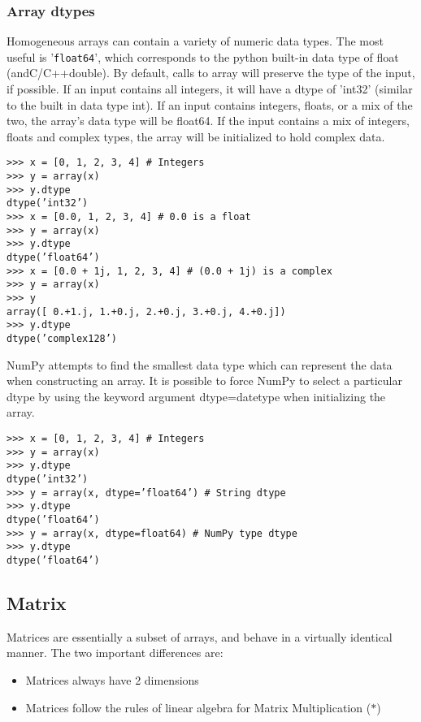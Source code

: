 \documentclass[KSmain.tex]{subfiles}
\begin{document}
\subsubsection*{Array dtypes}
Homogeneous arrays can contain a variety of numeric data types. The most useful is ’\texttt{float64}’, which corresponds
to the python built-in data type of float (andC/C++double). By default, calls to array will preserve
the type of the input, if possible. If an input contains all integers, it will have a dtype of ’int32’ (similar to
the built in data type int). If an input contains integers, floats, or a mix of the two, the array’s data type will
be float64. If the input contains a mix of integers, floats and complex types, the array will be initialized
to hold complex data.
\begin{framed}
\begin{verbatim}
>>> x = [0, 1, 2, 3, 4] # Integers
>>> y = array(x)
>>> y.dtype
dtype(’int32’)
>>> x = [0.0, 1, 2, 3, 4] # 0.0 is a float
>>> y = array(x)
>>> y.dtype
dtype(’float64’)
>>> x = [0.0 + 1j, 1, 2, 3, 4] # (0.0 + 1j) is a complex
>>> y = array(x)
>>> y
array([ 0.+1.j, 1.+0.j, 2.+0.j, 3.+0.j, 4.+0.j])
>>> y.dtype
dtype(’complex128’)
\end{verbatim}
\end{framed}
NumPy attempts to find the smallest data type which can represent the data when constructing an array.
It is possible to force NumPy to select a particular dtype by using the keyword argument dtype=datetype
when initializing the array.
\begin{framed}
\begin{verbatim}
>>> x = [0, 1, 2, 3, 4] # Integers
>>> y = array(x)
>>> y.dtype
dtype(’int32’)
>>> y = array(x, dtype=’float64’) # String dtype
>>> y.dtype
dtype(’float64’)
>>> y = array(x, dtype=float64) # NumPy type dtype
>>> y.dtype
dtype(’float64’)
\end{verbatim}
\end{framed}
\newpage
\subsection{Matrix}
Matrices are essentially a subset of arrays, and behave in a virtually identical manner. The two important
differences are:

\begin{itemize}
\item Matrices always have 2 dimensions
\item Matrices follow the rules of linear algebra for Matrix Multiplication ($\ast$)
\end{itemize}
\end{document}
